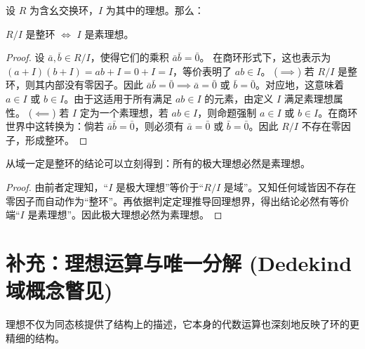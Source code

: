 \documentclass[11pt]{article}
\begin{document}
\begin{cntheorem}
设 $R$ 为含幺交换环，$I$ 为其中的理想。那么：
\begin{center}
    $R/I$ 是整环 $\iff$ $I$ 是素理想。
\end{center}
\end{cntheorem}
\begin{proof}
设 $\bar{a}, \bar{b} \in R/I$，使得它们的乘积 $\bar{a}\bar{b} = \bar{0}$。
在商环形式下，这也表示为 $(a+I)(b+I) = ab + I = 0 + I = I$，等价表明了 $ab \in I$。
($\implies$) 若 $R/I$ 是整环，则其内部没有零因子。因此 $\bar{a}\bar{b} = \bar{0} \implies \bar{a} = \bar{0}$ 或 $\bar{b} = \bar{0}$。对应地，这意味着 $a \in I$ 或 $b \in I$。由于这适用于所有满足 $ab \in I$ 的元素，由定义 $I$ 满足素理想属性。
($\impliedby$) 若 $I$ 定为一个素理想，若 $ab \in I$，则命题强制 $a \in I$ 或 $b \in I$。在商环世界中这转换为：倘若 $\bar{a}\bar{b} = \bar{0}$，则必须有 $\bar{a} = \bar{0}$ 或 $\bar{b} = \bar{0}$。因此 $R/I$ 不存在零因子，形成整环。
\end{proof}
\begin{cncorollary}
从域一定是整环的结论可以立刻得到：所有的极大理想必然是素理想。
\end{cncorollary}
\begin{proof}
由前者定理知，“$I$ 是极大理想”等价于“$R/I$ 是域”。又知任何域皆因不存在零因子而自动作为“整环”。再依据判定定理推导回理想界，得出结论必然有等价端“$I$ 是素理想”。因此极大理想必然为素理想。
\end{proof}

\section{补充：理想运算与唯一分解 (Dedekind 域概念瞥见)}

理想不仅为同态核提供了结构上的描述，它本身的代数运算也深刻地反映了环的更精细的结构。
\end{document}
